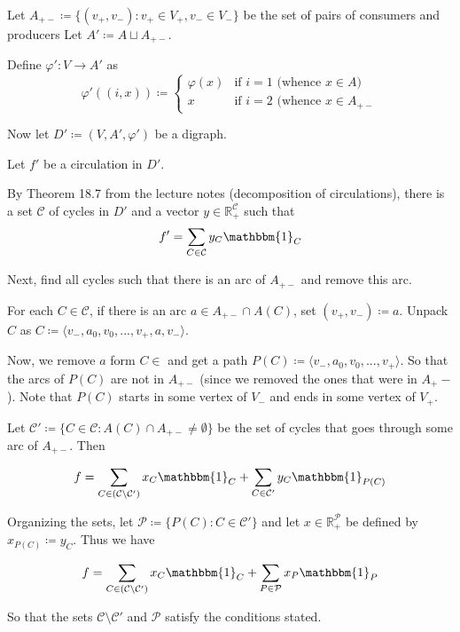\documentclass[a4paper,10pt, leqno]{article}
\theoremstyle{definition}
\def\blankpage{%
      \null%
      \clearpage}
\begin{document}
Let $A_{+-} \coloneqq \{(v_+, v_-) : v_+ \in V_+, v_- \in V_-\}$ be the set of pairs of consumers and producers  
Let $A' \coloneqq A \sqcup A_{+-}$.

Define $\varphi' : V \to A'$ as
$$
\varphi'((i, x)) \coloneqq
\left\{
	\begin{array}{ll}
		\varphi(x)  & \mbox{if } i = 1 \text{ (whence } x \in A) \\
		x  & \mbox{if } i = 2 \text{ (whence } x \in A_{+-}
    \end{array}
\right.
$$

Now let $D' \coloneqq (V, A', \varphi')$ be a digraph.

Let $f'$ be a circulation in $D'$.

By Theorem 18.7 from the lecture notes (decomposition of circulations), there is a set $\mathcal{C}$ of cycles in $D'$ and a vector $y \in \mathbb{R}_+^\mathcal{C}$ such that
$$
f'  = \sum_{C \in \mathcal{C}}{y_C\mathbbm{1}_C}
$$

Next, find all cycles such that there is an arc of $A_{+-}$ and remove this arc.

For each $C \in \mathcal{C}$, if there is an arc $a \in A_{+-} \cap A(C)$, set $(v_+, v_-) \coloneqq a$.
Unpack $C$ as $C \coloneqq \langle v_-, a_0, v_0, ..., v_+, a, v_- \rangle$.

Now, we remove $a$ form $C \in $ and get a path $P(C) \coloneqq \langle v_-, a_0, v_0, ..., v_+ \rangle$. So that the arcs of $P(C)$ are not in $A_{+-}$ (since we removed the ones that were in $A_+-$).  Note that $P(C)$ starts in some vertex of $V_-$ and ends in some vertex of $V_+$. 


Let $\mathcal{C}' \coloneqq \{C \in \mathcal{C} : A(C) \cap A_{+-} \neq \emptyset \}$ be the set of cycles that goes through some arc of $A_{+-}$. Then

$$
f = \sum_{C \in (\mathcal{C} \setminus \mathcal{C}') }{x_C \mathbbm{1}_C} + \sum_{C \in \mathcal{C}'}{y_C \mathbbm{1}_{P(C)}}
$$

Organizing the sets, let $\mathcal{P} \coloneqq \{P(C) : C \in \mathcal{C}' \}$ and let $x \in \mathbb{R}_+^\mathcal{P}$ be defined by $x_{P(C)} \coloneqq y_C$. Thus we have

$$
f = \sum_{C \in (\mathcal{C} \setminus \mathcal{C}') }{x_C \mathbbm{1}_C} + \sum_{P \in \mathcal{P}}{x_P \mathbbm{1}_{P}}
$$

So that the sets $\mathcal{C} \setminus \mathcal{C'}$ and $\mathcal{P}$ satisfy the conditions stated.  

\blankpage
\end{document}
